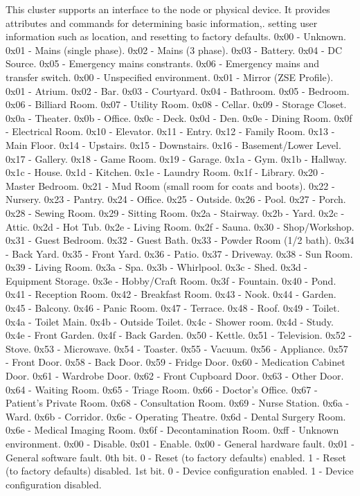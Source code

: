 This cluster supports an interface to the node or physical device. It provides attributes and commands for determining basic information,. setting user information such as location, and resetting to factory defaults. 				0x00 - Unknown. 				0x01 - Mains (single phase). 				0x02 - Mains (3 phase). 				0x03 - Battery. 				0x04 - DC Source. 				0x05 - Emergency mains constrants. 				0x06 - Emergency mains and transfer switch. 				0x00 - Unspecified environment. 				0x01 - Mirror (ZSE Profile). 				0x01 - Atrium. 				0x02 - Bar. 				0x03 - Courtyard. 				0x04 - Bathroom. 				0x05 - Bedroom. 				0x06 - Billiard Room. 				0x07 - Utility Room. 				0x08 - Cellar. 				0x09 - Storage Closet. 				0x0a - Theater. 				0x0b - Office. 				0x0c - Deck. 				0x0d - Den. 				0x0e - Dining Room. 				0x0f - Electrical Room. 				0x10 - Elevator. 				0x11 - Entry. 				0x12 - Family Room. 				0x13 - Main Floor. 				0x14 - Upstairs. 				0x15 - Downstairs. 				0x16 - Basement/Lower Level. 				0x17 - Gallery. 				0x18 - Game Room. 				0x19 - Garage. 				0x1a - Gym. 				0x1b - Hallway. 				0x1c - House. 				0x1d - Kitchen. 				0x1e - Laundry Room. 				0x1f - Library. 				0x20 - Master Bedroom. 				0x21 - Mud Room (small room for coats and boots). 				0x22 - Nursery. 				0x23 - Pantry. 				0x24 - Office. 				0x25 - Outside. 				0x26 - Pool. 				0x27 - Porch. 				0x28 - Sewing Room. 				0x29 - Sitting Room. 				0x2a - Stairway. 				0x2b - Yard. 				0x2c - Attic. 				0x2d - Hot Tub. 				0x2e - Living Room. 				0x2f - Sauna. 				0x30 - Shop/Workshop. 				0x31 - Guest Bedroom. 				0x32 - Guest Bath. 				0x33 - Powder Room (1/2 bath). 				0x34 - Back Yard. 				0x35 - Front Yard. 				0x36 - Patio. 				0x37 - Driveway. 				0x38 - Sun Room. 				0x39 - Living Room. 				0x3a - Spa. 				0x3b - Whirlpool. 				0x3c - Shed. 				0x3d - Equipment Storage. 				0x3e - Hobby/Craft Room. 				0x3f - Fountain. 				0x40 - Pond. 				0x41 - Reception Room. 				0x42 - Breakfast Room. 				0x43 - Nook. 				0x44 - Garden. 				0x45 - Balcony. 				0x46 - Panic Room. 				0x47 - Terrace. 				0x48 - Roof. 				0x49 - Toilet. 				0x4a - Toilet Main. 				0x4b - Outside Toilet. 				0x4c - Shower room. 				0x4d - Study. 				0x4e - Front Garden. 				0x4f - Back Garden. 				0x50 - Kettle. 				0x51 - Television. 				0x52 - Stove. 				0x53 - Microwave. 				0x54 - Toaster. 				0x55 - Vacuum. 				0x56 - Appliance. 				0x57 - Front Door. 				0x58 - Back Door. 				0x59 - Fridge Door. 				0x60 - Medication Cabinet Door. 				0x61 - Wardrobe Door. 				0x62 - Front Cupboard Door. 				0x63 - Other Door. 				0x64 - Waiting Room. 				0x65 - Triage Room. 				0x66 - Doctor’s Office. 				0x67 - Patient’s Private Room. 				0x68 - Consultation Room. 				0x69 - Nurse Station. 				0x6a - Ward. 				0x6b - Corridor. 				0x6c - Operating Theatre. 				0x6d - Dental Surgery Room. 				0x6e - Medical Imaging Room. 				0x6f - Decontamination Room. 				0xff - Unknown environment. 				0x00 - Disable. 				0x01 - Enable. 				0x00 - General hardware fault. 				0x01 - General software fault. 				0th bit. 				 0 - Reset (to factory defaults) enabled. 				 1 - Reset (to factory defaults) disabled. 				1st bit. 				 0 - Device configuration enabled. 				 1 - Device configuration disabled.
\newline

